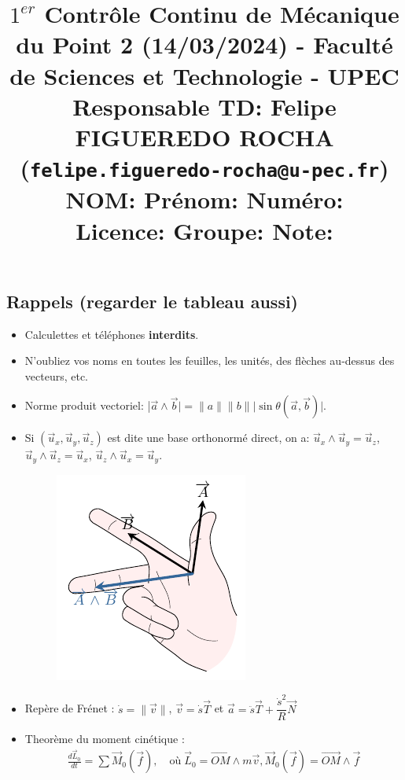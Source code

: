 \documentclass[french,10pt,twocolumn]{article}
\title{\vspace{-1cm} \large $1^{er}$ Contrôle Continu de Mécanique du Point 2 (14/03/2024) - 	Faculté de Sciences et Technologie - UPEC \\ 	Responsable TD: Felipe FIGUEREDO ROCHA (\texttt{felipe.figueredo-rocha@u-pec.fr}) \\
	NOM:\underline{\hspace{7cm}} Prénom: \underline{\hspace{5cm}}  Numéro: \underline{\hspace{2cm}} \\
	Licence:\underline{\hspace{7cm}} Groupe: \underline{\hspace{5cm}} Note: \underline{\hspace{1.5cm}}
	\vspace{-2cm}}
\author{}
\date{}
\begin{document}
	\maketitle
	
	\vspace{-0.5cm}
	\subsection*{Rappels (regarder le tableau aussi)}
	\begin{itemize}
		\item Calculettes et téléphones \textbf{interdits}.
		\item N'oubliez vos noms en toutes les feuilles, les unités, des flèches au-dessus des vecteurs, etc.
		\item Norme produit vectoriel: |$\vec{a} \wedge \vec{b}| =  \|a\| \|b\| |\sin{\theta}(\vec{a}, \vec{b})|$.
		\item Si $(\vec{u}_x, \vec{u}_y, \vec{u}_z)$ est dite une base orthonormé direct, on a: $\vec{u}_x \wedge \vec{u}_y = \vec{u}_z$, $\vec{u}_y \wedge \vec{u}_z = \vec{u}_x$, $\vec{u}_z \wedge \vec{u}_x = \vec{u}_y$.
		\begin{figure}[h!]
			\centering
			\includegraphics[width=0.3\linewidth]{regle_de_la_main_droite}
			\label{fig:regledelamaindroite}
		\end{figure}
		\vspace{-1cm}
		\item Repère de Frénet : $\dot{s} = \|\vec{v}\|$, $\vec{v} = \dot{s} \vec{T}$ et 
		$\vec{a} = \ddot{s} \vec{T} + \dfrac{\dot{s}^2}{R} \vec{N}$
		\item Theorème du moment cinétique :
		\begin{align*}
			\frac{d \vec{L}_0}{d t} = \sum \vec{M}_0(\vec{f}), \quad \text{où} \; \vec{L}_0 = \vec{OM}\wedge m\vec{v}, \vec{M}_0(\vec{f}) = \vec{OM}\wedge \vec{f}
		\end{align*}
	\end{itemize}
	
\end{document}
